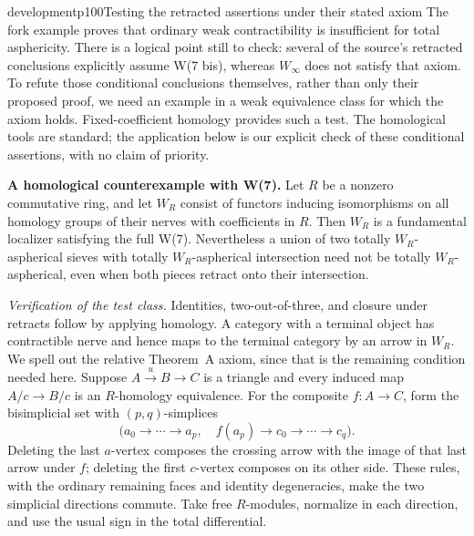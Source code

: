 \begin{dcomment}{development}{p100}{Testing the retracted assertions under their stated axiom}
The fork example proves that ordinary weak contractibility is insufficient for total asphericity. There is a logical point still to check: several of the source's retracted conclusions explicitly assume W(7 bis), whereas $W_\infty$ does not satisfy that axiom. To refute those conditional conclusions themselves, rather than only their proposed proof, we need an example in a weak equivalence class for which the axiom holds. Fixed-coefficient homology provides such a test. The homological tools are standard; the application below is our explicit check of these conditional assertions, with no claim of priority.

\textbf{A homological counterexample with W(7).}\ours\quad
Let $R$ be a nonzero commutative ring, and let $W_R$ consist of functors inducing isomorphisms on all homology groups of their nerves with coefficients in $R$. Then $W_R$ is a fundamental localizer satisfying the full W(7). Nevertheless a union of two totally $W_R$-aspherical sieves with totally $W_R$-aspherical intersection need not be totally $W_R$-aspherical, even when both pieces retract onto their intersection.

\emph{Verification of the test class.} Identities, two-out-of-three, and closure under retracts follow by applying homology. A category with a terminal object has contractible nerve and hence maps to the terminal category by an arrow in $W_R$. We spell out the relative Theorem~A axiom, since that is the remaining condition needed here. Suppose $A\xrightarrow{u}B\to C$ is a triangle and every induced map $A/c\to B/c$ is an $R$-homology equivalence. For the composite $f:A\to C$, form the bisimplicial set with $(p,q)$-simplices
\[
 \bigl(a_0\to\cdots\to a_p,\quad
       f(a_p)\to c_0\to\cdots\to c_q\bigr).
\]
Deleting the last $a$-vertex composes the crossing arrow with the image of that last arrow under $f$; deleting the first $c$-vertex composes on its other side. These rules, with the ordinary remaining faces and identity degeneracies, make the two simplicial directions commute. Take free $R$-modules, normalize in each direction, and use the usual sign in the total differential.


\end{dcomment}
